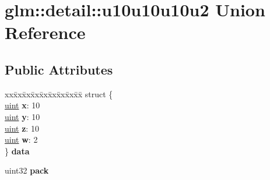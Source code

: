\hypertarget{unionglm_1_1detail_1_1u10u10u10u2}{}\section{glm\+:\+:detail\+:\+:u10u10u10u2 Union Reference}
\label{unionglm_1_1detail_1_1u10u10u10u2}
\subsection*{Public Attributes}
\begin{DoxyCompactItemize}
\item 
\mbox{\label{unionglm_1_1detail_1_1u10u10u10u2_a2b1c07bb6d4d674dade5bd7c1e91c791}} 
\begin{tabbing}
xx\=xx\=xx\=xx\=xx\=xx\=xx\=xx\=xx\=\kill
struct \{\\
\mbox{\label{unionglm_1_1detail_1_1u10u10u10u2_a626dafa32232f658b49189501fd40300}} 
\hyperlink{group__core__precision_ga4fd29415871152bfb5abd588334147c8}{uint} {\bfseries x}: 10\\
\mbox{\label{unionglm_1_1detail_1_1u10u10u10u2_aad22ec1968f6fe66f6805435f8aa09f0}} 
\hyperlink{group__core__precision_ga4fd29415871152bfb5abd588334147c8}{uint} {\bfseries y}: 10\\
\mbox{\label{unionglm_1_1detail_1_1u10u10u10u2_a781622b767bd5af0bc5181f4ce8c3829}} 
\hyperlink{group__core__precision_ga4fd29415871152bfb5abd588334147c8}{uint} {\bfseries z}: 10\\
\mbox{\label{unionglm_1_1detail_1_1u10u10u10u2_a24c2ccbe5dd0495a3b859d8a56ff5e59}} 
\hyperlink{group__core__precision_ga4fd29415871152bfb5abd588334147c8}{uint} {\bfseries w}: 2\\
\} {\bfseries data}\\

\end{tabbing}\item 
\mbox{\label{unionglm_1_1detail_1_1u10u10u10u2_a8bb9d7804af09ba3790a4b5622321511}} 
uint32 {\bfseries pack}
\end{DoxyCompactItemize}


